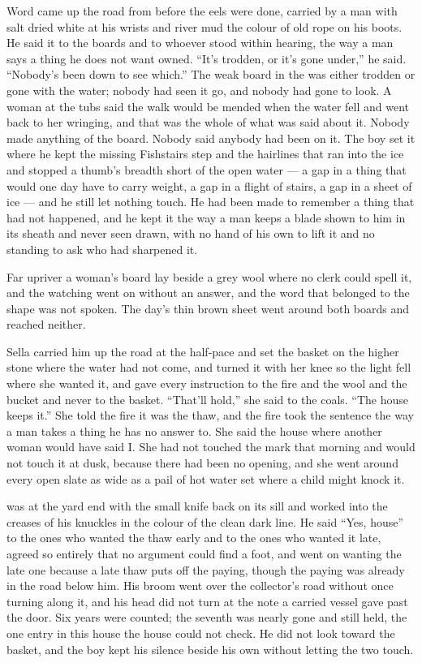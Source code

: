 \scenebreak

Word came up the road from  before the eels were done, carried by a man with salt dried white at his wrists and river mud the colour of old rope on his boots. He said it to the boards and to whoever stood within hearing, the way a man says a thing he does not want owned. “It's trodden, or it's gone under,” he said. “Nobody's been down to see which.” The weak board in the  was either trodden or gone with the water; nobody had seen it go, and nobody had gone to look. A woman at the tubs said the walk would be mended when the water fell and went back to her wringing, and that was the whole of what was said about it. Nobody made anything of the board. Nobody said anybody had been on it. The boy set it where he kept the missing Fishstairs step and the hairlines that ran into the ice and stopped a thumb's breadth short of the open water --- a gap in a thing that would one day have to carry weight, a gap in a flight of stairs, a gap in a sheet of ice --- and he still let nothing touch. He had been made to remember a thing that had not happened, and he kept it the way a man keeps a blade shown to him in its sheath and never seen drawn, with no hand of his own to lift it and no standing to ask who had sharpened it.

Far upriver a woman's board lay beside a grey wool  where no clerk could spell it, and the watching went on without an answer, and the word that belonged to the shape was not spoken. The day's thin brown sheet went around both boards and reached neither.

Sella carried him up the road at the half-pace and set the basket on the higher stone where the water had not come, and turned it with her knee so the light fell where she wanted it, and gave every instruction to the fire and the wool and the bucket and never to the basket. “That'll hold,” she said to the coals. “The house keeps it.” She told the fire it was the thaw, and the fire took the sentence the way a man takes a thing he has no answer to. She said the house where another woman would have said I. She had not touched the mark that morning and would not touch it at dusk, because there had been no opening, and she went around every open slate as wide as a pail of hot water set where a child might knock it.

 was at the yard end with the small knife back on its sill and  worked into the creases of his knuckles in the colour of the clean dark line. He said “Yes, house” to the ones who wanted the thaw early and to the ones who wanted it late, agreed so entirely that no argument could find a foot, and went on wanting the late one because a late thaw puts off the paying, though the paying was already in the road below him. His broom went over the collector's road without once turning along it, and his head did not turn at the note a carried vessel gave past the door. Six years were counted; the seventh was nearly gone and still held, the one entry in this house the house could not check. He did not look toward the basket, and the boy kept his silence beside his own without letting the two touch.

